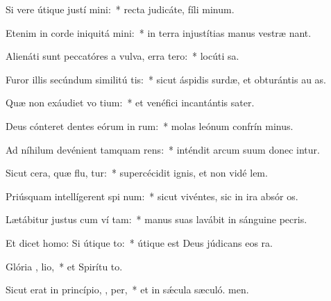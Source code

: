 \item Si vere útique justí mini:~* recta judicáte, fíli minum.
\item Etenim in corde iniquitá mini:~* in terra injustítias manus vestræ nant.
\item Alienáti sunt peccatóres a vulva, erra  tero:~* locúti  sa.
\item Furor illis secúndum similitú tis:~* sicut áspidis surdæ, et obturántis au as.
\item Quæ non exáudiet vo tium:~* et venéfici incantántis sater.
\item Deus cónteret dentes eórum in  rum:~* molas leónum confrín minus.
\item Ad níhilum devénient tamquam  rens:~* inténdit arcum suum donec intur.
\item Sicut cera, quæ flu, tur:~* supercécidit ignis, et non vidé lem.
\item Priúsquam intellígerent spi  num:~* sicut vivéntes, sic in ira absór os.
\item Lætábitur justus cum ví tam:~* manus suas lavábit in sánguine pecris.
\item Et dicet homo: Si útique   to:~* útique est Deus júdicans eos  ra.
\item Glória ,  lio,~* et Spirítu to.
\item Sicut erat in princípio,  ,  per,~* et in sǽcula sæculó. men.
